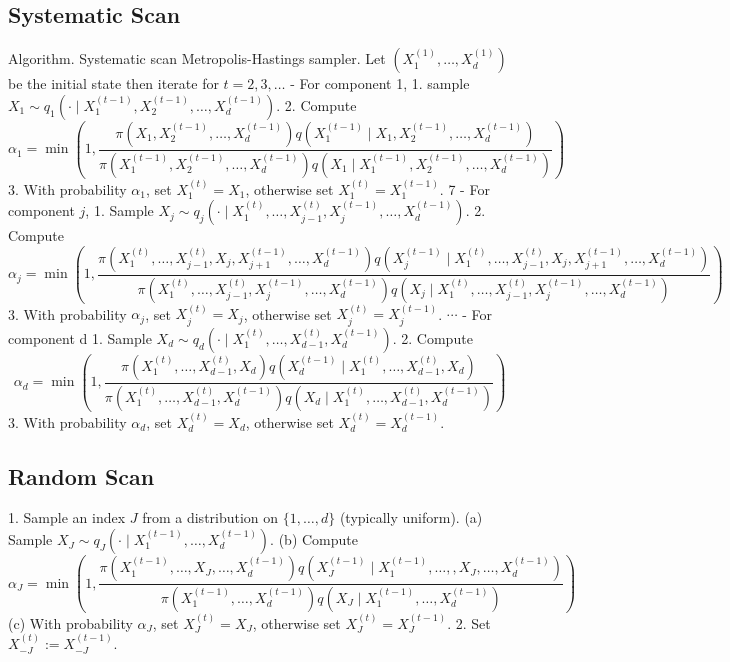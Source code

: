 \documentclass{article}
\begin{document}
\subsection{Systematic Scan}
Algorithm. Systematic scan Metropolis-Hastings sampler. Let $\left(X_1^{(1)}, \ldots, X_d^{(1)}\right)$ be the initial state then iterate for $t=2,3, \ldots$
- For component 1,
1. sample $X_1 \sim q_1\left(\cdot \mid X_1^{(t-1)}, X_2^{(t-1)}, \ldots, X_d^{(t-1)}\right)$.
2. Compute
$$
\alpha_1=\min \left(1, \frac{\pi\left(X_1, X_2^{(t-1)}, \ldots, X_d^{(t-1)}\right) q\left(X_1^{(t-1)} \mid X_1, X_2^{(t-1)}, \ldots, X_d^{(t-1)}\right)}{\pi\left(X_1^{(t-1)}, X_2^{(t-1)}, \ldots, X_d^{(t-1)}\right) q\left(X_1 \mid X_1^{(t-1)}, X_2^{(t-1)}, \ldots, X_d^{(t-1)}\right)}\right)
$$
3. With probability $\alpha_1$, set $X_1^{(t)}=X_1$, otherwise set $X_1^{(t)}=X_1^{(t-1)}$.
7
- For component $j$,
1. Sample $X_j \sim q_j\left(\cdot \mid X_1^{(t)}, \ldots, X_{j-1}^{(t)}, X_j^{(t-1)}, \ldots, X_d^{(t-1)}\right)$.
2. Compute
$$
\alpha_j=\min \left(1, \frac{\pi\left(X_1^{(t)}, \ldots, X_{j-1}^{(t)}, X_j, X_{j+1}^{(t-1)}, \ldots, X_d^{(t-1)}\right) q\left(X_j^{(t-1)} \mid X_1^{(t)}, \ldots, X_{j-1}^{(t)}, X_j, X_{j+1}^{(t-1)}, \ldots, X_d^{(t-1)}\right)}{\pi\left(X_1^{(t)}, \ldots, X_{j-1}^{(t)}, X_j^{(t-1)}, \ldots, X_d^{(t-1)}\right) q\left(X_j \mid X_1^{(t)}, \ldots, X_{j-1}^{(t)}, X_j^{(t-1)}, \ldots, X_d^{(t-1)}\right)}\right)
$$
3. With probability $\alpha_j$, set $X_j^{(t)}=X_j$, otherwise set $X_j^{(t)}=X_j^{(t-1)}$.
$\cdots$
- For component d
1. Sample $X_d \sim q_d\left(\cdot \mid X_1^{(t)}, \ldots, X_{d-1}^{(t)}, X_d^{(t-1)}\right)$.
2. Compute
$$
\alpha_d=\min \left(1, \frac{\pi\left(X_1^{(t)}, \ldots, X_{d-1}^{(t)}, X_d\right) q\left(X_d^{(t-1)} \mid X_1^{(t)}, \ldots, X_{d-1}^{(t)}, X_d\right)}{\pi\left(X_1^{(t)}, \ldots, X_{d-1}^{(t)}, X_d^{(t-1)}\right) q\left(X_d \mid X_1^{(t)}, \ldots, X_{d-1}^{(t)}, X_d^{(t-1)}\right)}\right)
$$
3. With probability $\alpha_d$, set $X_d^{(t)}=X_d$, otherwise set $X_d^{(t)}=X_d^{(t-1)}$.
\subsection{Random Scan}
1. Sample an index $J$ from a distribution on $\{1, \ldots, d\}$ (typically uniform).
(a) Sample $X_J \sim q_J\left(\cdot \mid X_1^{(t-1)}, \ldots, X_d^{(t-1)}\right)$.
(b) Compute
$$
\alpha_J=\min \left(1, \frac{\pi\left(X_1^{(t-1)}, \ldots, X_J, \ldots, X_d^{(t-1)}\right) q\left(X_J^{(t-1)} \mid X_1^{(t-1)}, \ldots,, X_J, \ldots, X_d^{(t-1)}\right)}{\pi\left(X_1^{(t-1)}, \ldots, X_d^{(t-1)}\right) q\left(X_J \mid X_1^{(t-1)}, \ldots, X_d^{(t-1)}\right)}\right)
$$
(c) With probability $\alpha_J$, set $X_J^{(t)}=X_J$, otherwise set $X_J^{(t)}=X_J^{(t-1)}$.
2. Set $X_{-J}^{(t)}:=X_{-J}^{(t-1)}$.
\end{document}
